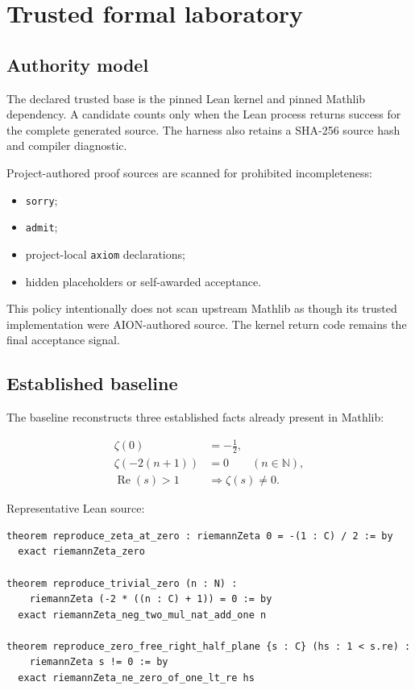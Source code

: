 \documentclass[11pt,a4paper]{article}
\newcommand{\code}[1]{\texttt{#1}}
\newcommand{\RePart}{\operatorname{Re}}
\begin{document}
\section{Trusted formal laboratory}

\subsection{Authority model}

The declared trusted base is the pinned Lean kernel and pinned Mathlib
dependency. A candidate counts only when the Lean process returns success for
the complete generated source. The harness also retains a SHA-256 source hash
and compiler diagnostic.

Project-authored proof sources are scanned for prohibited incompleteness:
\begin{itemize}
  \item \code{sorry};
  \item \code{admit};
  \item project-local \code{axiom} declarations;
  \item hidden placeholders or self-awarded acceptance.
\end{itemize}

This policy intentionally does not scan upstream Mathlib as though its trusted
implementation were AION-authored source. The kernel return code remains the
final acceptance signal.

\subsection{Established baseline}

The baseline reconstructs three established facts already present in Mathlib:

\begin{align*}
  \zeta(0) &= -\frac12,\\
  \zeta\!\left(-2(n+1)\right) &= 0 \qquad (n\in\mathbb{N}),\\
  \RePart(s)>1 &\Longrightarrow \zeta(s)\neq 0.
\end{align*}

Representative Lean source:

\begin{lstlisting}
theorem reproduce_zeta_at_zero : riemannZeta 0 = -(1 : C) / 2 := by
  exact riemannZeta_zero

theorem reproduce_trivial_zero (n : N) :
    riemannZeta (-2 * ((n : C) + 1)) = 0 := by
  exact riemannZeta_neg_two_mul_nat_add_one n

theorem reproduce_zero_free_right_half_plane {s : C} (hs : 1 < s.re) :
    riemannZeta s != 0 := by
  exact riemannZeta_ne_zero_of_one_lt_re hs
\end{lstlisting}
\end{document}

